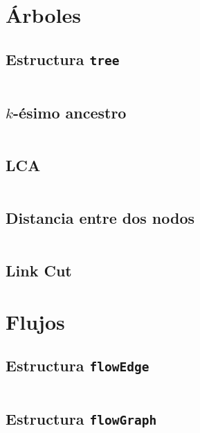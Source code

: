 \documentclass[11pt]{article}
\begin{document}
		
	\newpage
	\section{Árboles}		
		\subsection{Estructura \texttt{tree}}
		\inputminted[tabsize=2,breaklines,firstline=432,lastline=470,fontsize=\small]{c++}{graph.cpp}
		
		\subsection{$k$-ésimo ancestro}
		\inputminted[tabsize=2,breaklines,firstline=472,lastline=484,fontsize=\small]{c++}{graph.cpp}
		
		\subsection{LCA}
		\inputminted[tabsize=2,breaklines,firstline=486,lastline=505,fontsize=\small]{c++}{graph.cpp}
		
		\subsection{Distancia entre dos nodos}
		\inputminted[tabsize=2,breaklines,firstline=507,lastline=530,fontsize=\small]{c++}{graph.cpp}
		
		\subsection{Link Cut}
		
		
	\newpage
	\section{Flujos}
		\subsection{Estructura \texttt{flowEdge}}
		\inputminted[tabsize=2,breaklines,firstline=4,lastline=17,fontsize=\small]{c++}{flow.cpp}
		
		\subsection{Estructura \texttt{flowGraph}}
		\inputminted[tabsize=2,breaklines,firstline=19,lastline=38,fontsize=\small]{c++}{flow.cpp}
		
\end{document}

